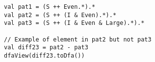 \begin{lstlisting}[style=reclojureScala]
val pat1 = (S ++ Even.*).*
val pat2 = (S ++ (I & Even).*).*
val pat3 = (S ++ (I & Even & Large).*).*

// Example of element in pat2 but not pat3
val diff23 = pat2 - pat3
dfaView(diff23.toDfa())
\end{lstlisting}
